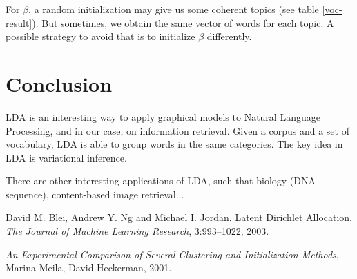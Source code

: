 \documentclass{article}
\begin{document}
For $\beta$, a random initialization may give us some coherent topics (see table \ref{voc-result}). But sometimes, we obtain the same vector of words for each topic. A possible strategy to avoid that is to initialize $\beta$ differently.

\section{Conclusion}

LDA is an interesting way to apply graphical models to Natural Language Processing, and in our case, on information retrieval. Given a corpus and a set of vocabulary, LDA is able to group words in the same categories. The key idea in LDA is variational inference. 

There are other interesting applications of LDA, such that biology (DNA sequence), content-based image retrieval$\ldots$

\begin{thebibliography}{BNJ03}
 David M. Blei, Andrew Y. Ng and Michael I. Jordan. Latent Dirichlet Allocation. \emph{The Journal of Machine Learning Research}, 3:993--1022, 2003.

 \emph{An Experimental Comparison of Several Clustering and Initialization Methods}, Marina Meila, David Heckerman, 2001.
\end{thebibliography}
\end{document}
